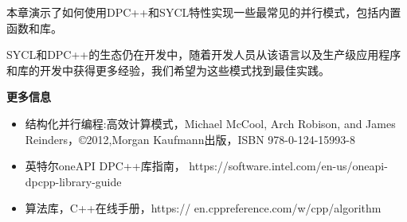 

本章演示了如何使用DPC++和SYCL特性实现一些最常见的并行模式，包括内置函数和库。\par

SYCL和DPC++的生态仍在开发中，随着开发人员从该语言以及生产级应用程序和库的开发中获得更多经验，我们希望为这些模式找到最佳实践。\par


\hspace*{\fill} \par %
\textbf{更多信息}

\begin{itemize}
	\item 结构化并行编程:高效计算模式，Michael McCool, Arch Robison, and James Reinders，©2012,Morgan Kaufmann出版，ISBN 978-0-124-15993-8
	\item 英特尔oneAPI DPC++库指南， https://software.intel.com/en-us/oneapi-dpcpp-library-guide
	\item 算法库，C++在线手册，https://	en.cppreference.com/w/cpp/algorithm
\end{itemize}


\newpage